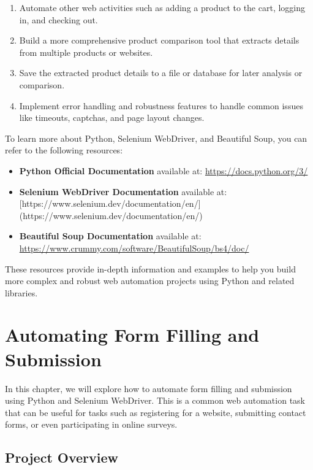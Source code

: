 \documentclass[
  paper=a4,
  ,captions=tableheading
]{scrartcl}
\providecommand{\tightlist}{%
  \setlength{\itemsep}{0pt}\setlength{\parskip}{0pt}}
\begin{document}
\begin{enumerate}
\def\labelenumi{\arabic{enumi}.}
\tightlist
\item
  Automate other web activities such as adding a product to the cart,
  logging in, and checking out.
\item
  Build a more comprehensive product comparison tool that extracts
  details from multiple products or websites.
\item
  Save the extracted product details to a file or database for later
  analysis or comparison.
\item
  Implement error handling and robustness features to handle common
  issues like timeouts, captchas, and page layout changes.
\end{enumerate}

To learn more about Python, Selenium WebDriver, and Beautiful Soup, you
can refer to the following resources:

\begin{itemize}
\tightlist
\item
  \textbf{Python Official Documentation} available at:
  \url{https://docs.python.org/3/}
\item
  \textbf{Selenium WebDriver Documentation} available at:
  {[}https://www.selenium.dev/documentation/en/{]}
  (https://www.selenium.dev/documentation/en/)
\item
  \textbf{Beautiful Soup Documentation } available at:
  \url{https://www.crummy.com/software/BeautifulSoup/bs4/doc/}
\end{itemize}

These resources provide in-depth information and examples to help you
build more complex and robust web automation projects using Python and
related libraries.

\hypertarget{automating-form-filling-and-submission}{%
\chapter{Automating Form Filling and
Submission}\label{automating-form-filling-and-submission}}

In this chapter, we will explore how to automate form filling and
submission using Python and Selenium WebDriver. This is a common web
automation task that can be useful for tasks such as registering for a
website, submitting contact forms, or even participating in online
surveys.

\hypertarget{project-overview-1}{%
\section{Project Overview}\label{project-overview-1}}
\end{document}
